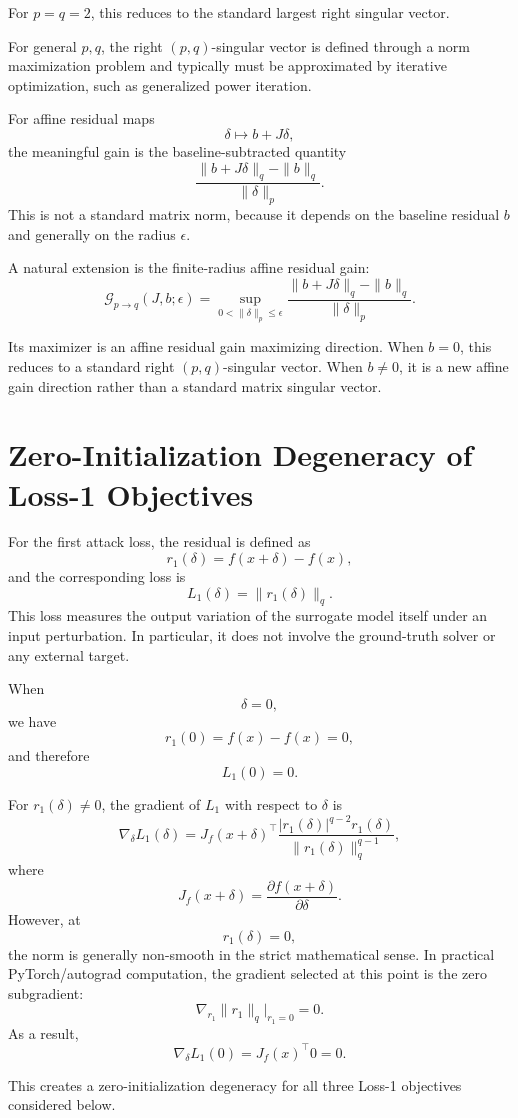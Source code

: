 \documentclass{article}
\begin{document}
For $p=q=2$, this reduces to the standard largest right singular vector.

For general $p,q$, the right $(p,q)$-singular vector is defined through a norm maximization problem and typically must be approximated by iterative optimization, such as generalized power iteration.

For affine residual maps
\[
\delta\mapsto b+J\delta,
\]
the meaningful gain is the baseline-subtracted quantity
\[
\frac{
\|b+J\delta\|_q-\|b\|_q
}{
\|\delta\|_p
}.
\]
This is not a standard matrix norm, because it depends on the baseline residual $b$ and generally on the radius $\epsilon$.

A natural extension is the finite-radius affine residual gain:
\[
\mathcal G_{p\to q}(J,b;\epsilon)
=
\sup_{0<\|\delta\|_p\le\epsilon}
\frac{
\|b+J\delta\|_q-\|b\|_q
}{
\|\delta\|_p
}.
\]

Its maximizer is an affine residual gain maximizing direction. When $b=0$, this reduces to a standard right $(p,q)$-singular vector. When $b\neq0$, it is a new affine gain direction rather than a standard matrix singular vector.

\section{Zero-Initialization Degeneracy of Loss-1 Objectives}

For the first attack loss, the residual is defined as
\[
r_1(\delta) = f(x+\delta)-f(x),
\]
and the corresponding loss is
\[
L_1(\delta)=\|r_1(\delta)\|_q.
\]
This loss measures the output variation of the surrogate model itself under an input perturbation. In particular, it does not involve the ground-truth solver or any external target.

When
\[
\delta = 0,
\]
we have
\[
r_1(0)=f(x)-f(x)=0,
\]
and therefore
\[
L_1(0)=0.
\]

For \(r_1(\delta)\neq 0\), the gradient of \(L_1\) with respect to \(\delta\) is
\[
\nabla_\delta L_1(\delta)
=
J_f(x+\delta)^\top
\frac{
|r_1(\delta)|^{q-2}r_1(\delta)
}{
\|r_1(\delta)\|_q^{q-1}
},
\]
where
\[
J_f(x+\delta)=\frac{\partial f(x+\delta)}{\partial \delta}.
\]
However, at
\[
r_1(\delta)=0,
\]
the norm is generally non-smooth in the strict mathematical sense. In practical PyTorch/autograd computation, the gradient selected at this point is the zero subgradient:
\[
\nabla_{r_1}\|r_1\|_q\big|_{r_1=0}=0.
\]
As a result,
\[
\nabla_\delta L_1(0)
=
J_f(x)^\top 0
=
0.
\]

This creates a zero-initialization degeneracy for all three Loss-1 objectives considered below.
\end{document}

